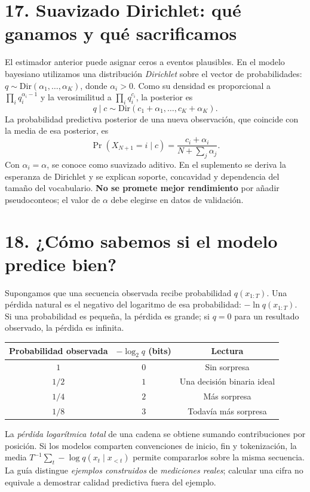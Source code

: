 \section*{17. Suavizado Dirichlet: qué ganamos y qué sacrificamos}
El estimador anterior puede asignar ceros a eventos plausibles. En el modelo bayesiano utilizamos una distribución \emph{Dirichlet} sobre el vector de probabilidades: $q\sim\mathrm{Dir}(\alpha_1,\ldots,\alpha_K)$, donde $\alpha_i>0$. Como su densidad es proporcional a $\prod_iq_i^{\alpha_i-1}$ y la verosimilitud a $\prod_iq_i^{c_i}$, la posterior es
\[
q\mid c\sim\mathrm{Dir}(c_1+\alpha_1,\ldots,c_K+\alpha_K).
\]
La probabilidad predictiva posterior de una nueva observación, que coincide con la media de esa posterior, es
\[
\boxed{\Pr(X_{N+1}=i\mid c)=\frac{c_i+\alpha_i}{N+\sum_j\alpha_j}.}
\]
Con $\alpha_i=\alpha$, se conoce como suavizado aditivo. En el suplemento se deriva la esperanza de Dirichlet y se explican soporte, concavidad y dependencia del tamaño del vocabulario. \textbf{No se promete mejor rendimiento} por añadir pseudoconteos; el valor de $\alpha$ debe elegirse en datos de validación.

\section*{18. ¿Cómo sabemos si el modelo predice bien?}
Supongamos que una secuencia observada recibe probabilidad $q(x_{1:T})$. Una pérdida natural es el negativo del logaritmo de esa probabilidad: $-\ln q(x_{1:T})$. Si una probabilidad es pequeña, la pérdida es grande; si $q=0$ para un resultado observado, la pérdida es infinita.
\begin{center}
\begin{tabular}{c|c|c}\toprule
Probabilidad observada & $-\log_2q$ (bits) & Lectura\\\midrule
$1$ & $0$ & Sin sorpresa\\
$1/2$ & $1$ & Una decisión binaria ideal\\
$1/4$ & $2$ & Más sorpresa\\
$1/8$ & $3$ & Todavía más sorpresa\\\bottomrule
\end{tabular}
\end{center}
La \emph{pérdida logarítmica total} de una cadena se obtiene sumando contribuciones por posición. Si los modelos comparten convenciones de inicio, fin y tokenización, la media $T^{-1}\sum_t-\log q(x_t\mid x_{<t})$ permite compararlos sobre la misma secuencia. La guía distingue \emph{ejemplos construidos} de \emph{mediciones reales}; calcular una cifra no equivale a demostrar calidad predictiva fuera del ejemplo.

